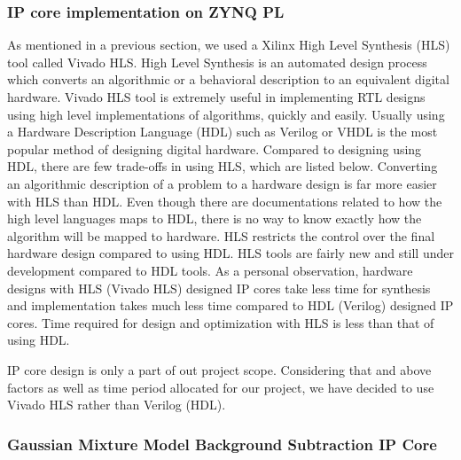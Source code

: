 \documentclass[12pt,a4paper]{report}
\begin{document}
\subsubsection{IP core implementation on ZYNQ PL}

As mentioned in a previous section, we used a Xilinx High Level Synthesis (HLS) tool called Vivado HLS. High Level Synthesis is an automated design process which converts an algorithmic or a behavioral description to an equivalent digital hardware. Vivado HLS tool is extremely useful in implementing RTL designs using high level implementations of algorithms, quickly and easily. 
Usually using a Hardware Description Language (HDL) such as Verilog or VHDL is the most popular method of designing digital hardware. Compared to designing using HDL, there are few trade-offs in using HLS, which are listed below.
Converting an algorithmic description of a problem to a hardware design is far more easier with HLS than HDL.
Even though there are documentations related to how the high level languages maps to HDL, there is no way to know exactly how the algorithm will be mapped to hardware.
HLS restricts the control over the final hardware design compared to using HDL.
HLS tools are fairly new and still under development compared to HDL tools.
As a personal observation, hardware designs with HLS (Vivado HLS) designed IP cores take less time for synthesis and implementation takes much less time compared to HDL (Verilog) designed IP cores.
Time required for design and optimization with HLS is less than that of using HDL.

IP core design is only a part of out project scope. Considering that and above factors as well as time period allocated for our project, we have decided to use Vivado HLS rather than Verilog (HDL). 


\subsubsection{Gaussian Mixture Model Background Subtraction IP Core}
\end{document}
